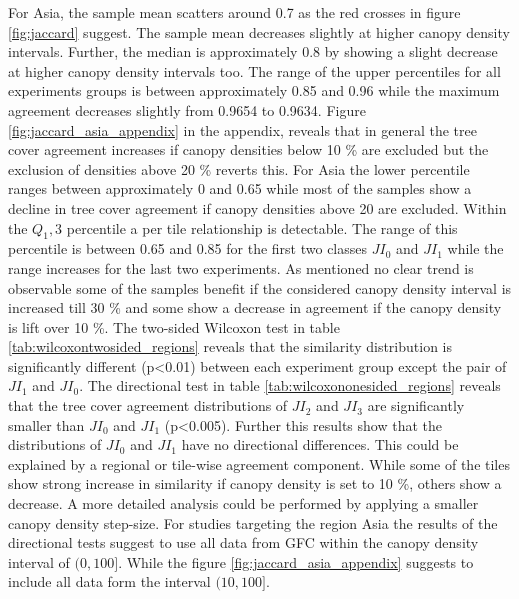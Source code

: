			For Asia, the sample mean scatters around 0.7 as the red crosses in figure \ref{fig:jaccard} suggest. The sample mean decreases slightly at higher canopy density intervals. Further, the median is approximately 0.8 by showing a slight decrease at higher canopy density intervals too. The range of the upper percentiles for all experiments groups is between approximately 0.85 and 0.96 while the maximum agreement decreases slightly from 0.9654 to 0.9634. Figure \ref{fig:jaccard_asia_appendix} in the appendix, reveals that in general the tree cover agreement increases if canopy densities below 10 \% are excluded but the exclusion of densities above 20 \% reverts this. For Asia the lower percentile ranges between approximately 0 and 0.65 while most of the samples show a decline in tree cover agreement if canopy densities above 20 are excluded. Within the $Q_1,3$ percentile a per tile relationship is detectable. The range of this percentile is between 0.65 and 0.85 for the first two classes $JI_0$ and $JI_1$ while the range increases for the last two experiments. As mentioned no clear trend is observable some of the samples benefit if the considered canopy density interval is increased till 30 \% and some show a decrease in agreement if the canopy density is lift over 10 \%. The two-sided Wilcoxon test in table \ref{tab:wilcoxontwosided_regions} reveals that the similarity distribution is significantly different (p<0.01) between each experiment group except the pair of $JI_1$ and $JI_0$. The directional test in table \ref{tab:wilcoxononesided_regions} reveals that the tree cover agreement distributions of $JI_2$ and $JI_3$ are significantly smaller than $JI_0$ and $JI_1$ (p<0.005). Further this results show that the distributions of $JI_0$ and $JI_1$ have no directional differences. This could be explained by a regional or tile-wise agreement component. While some of the tiles show strong increase in similarity if canopy density is set to 10 \%, others show a decrease. A more detailed analysis could be performed by applying a smaller canopy density step-size. For studies targeting the region Asia the results of the directional tests suggest to use all data from \ac{GFC} within the canopy density interval of $(0,100]$. While the figure \ref{fig:jaccard_asia_appendix} suggests to include all data form the interval $(10,100]$.

